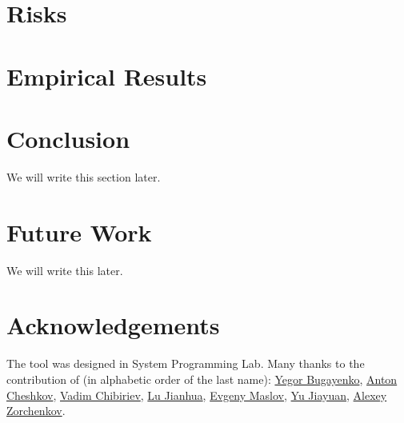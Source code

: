 \documentclass[12pt]{article}
\begin{document}
\section{Risks}
\label{sec:risks}


% 

\section{Empirical Results}
\label{sec:results}


\section{Conclusion}
We will write this section later.

\section{Future Work}
We will write this later.

\section{Acknowledgements}
The tool was designed in System Programming Lab. Many thanks
to the contribution of (in alphabetic order of the last name):
\href{mailto:yegor.bugayenko@huawei.com}{Yegor Bugayenko},
\href{mailto:anton.cheshkov@huawei.com}{Anton Cheshkov},
\href{mailto:chibirev.vadim@huawei.com}{Vadim Chibiriev},
\href{mailto:lujianhua@huawei.com}{Lu Jianhua},
\href{mailto:evgeny.maslov@huawei.com}{Evgeny Maslov},
\href{mailto:yu.jia.yuan@huawei.com}{Yu Jiayuan},
\href{mailto:zorchenkov.alexey@huawei.com}{Alexey Zorchenkov}.

%


\end{document}
